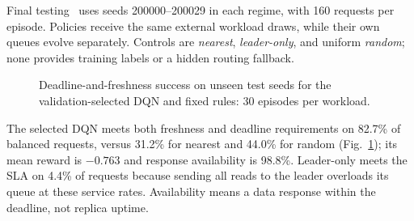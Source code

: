 \documentclass[10pt,a4paper,twocolumn]{article}
\begin{document}
Final testing~\cite{evidence} uses seeds 200000--200029 in each regime, with 160 requests per
episode. Policies receive the same external workload draws, while their own
queues evolve separately. Controls are \emph{nearest}, \emph{leader-only}, and
uniform \emph{random}; none provides training labels or a hidden routing
fallback.

\begin{figure}[t]
\centering
{}
\caption{Deadline-and-freshness success on unseen test seeds for the
validation-selected DQN and fixed rules: 30 episodes per workload.}
\label{fig:policies}
\end{figure}

The selected DQN meets both freshness and deadline requirements on 82.7\% of
balanced requests, versus 31.2\% for nearest and 44.0\% for random
(Fig.~\ref{fig:policies}); its mean reward is $-0.763$ and response
availability is 98.8\%. Leader-only meets the SLA on 4.4\% of requests because
sending all reads to the leader overloads its queue at these service rates.
Availability means a data response within the deadline, not replica uptime.
\end{document}

